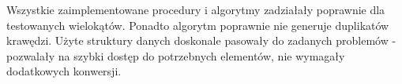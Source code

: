 \quad 
Wszystkie zaimplementowane procedury i algorytmy zadziałały poprawnie dla testowanych wielokątów. 
Ponadto algorytm poprawnie nie generuje duplikatów krawędzi. 
Użyte struktury danych doskonale pasowały do zadanych problemów - pozwalały na szybki dostęp do potrzebnych elementów, nie wymagały dodatkowych konwersji. 
